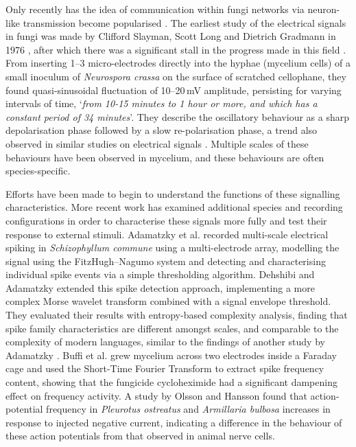 Only recently has the idea of communication within fungi networks via neuron-like transmission become popularised \cite{hunter} \cite{buffi2025review}. The earliest study of the electrical signals in fungi was made by Clifford Slayman, Scott Long and Dietrich Gradmann in 1976 \cite{slayman}, after which there was a significant stall in the progress made in this field \cite{buffi2025review}. From inserting 1--3 micro-electrodes directly into the hyphae (mycelium cells) of a small inoculum of \emph{Neurospora crassa} on the surface of scratched cellophane, they found quasi-sinusoidal fluctuation of 10--20\,mV amplitude, persisting for varying intervals of time, `\emph{from 10-15 minutes to 1 hour or more, and which has a constant period of 34 minutes}'. They describe the oscillatory behaviour as a sharp depolarisation phase followed by a slow re-polarisation phase, a trend also observed in similar studies on electrical signals \cite{adamatzky2023} \cite{springer}. Multiple scales of these behaviours have been observed in mycelium, and these behaviours are often species-specific.

Efforts have been made to begin to understand the functions of these signalling characteristics. More recent work has examined additional species and recording configurations in order to characterise these signals more fully and test their response to external stimuli. Adamatzky et al. \cite{adamatzky2023} recorded multi-scale electrical spiking in \emph{Schizophyllum commune} using a multi-electrode array, modelling the signal using the FitzHugh--Nagumo system and detecting and characterising individual spike events via a simple thresholding algorithm. Dehshibi and Adamatzky \cite{dehshibi} extended this spike detection approach, implementing a more complex Morse wavelet transform combined with a signal envelope threshold. They evaluated their results with entropy-based complexity analysis, finding that spike family characteristics are different amongst scales, and comparable to the complexity of modern languages, similar to the findings of another study by Adamatzky \cite{adamatzky2022}. Buffi et al. \cite{buffi} grew mycelium across two electrodes inside a Faraday cage and used the Short-Time Fourier Transform to extract spike frequency content, showing that the fungicide cycloheximide had a significant dampening effect on frequency activity. A study by Olsson and Hansson \cite{olsson} found that action-potential frequency in \emph{Pleurotus ostreatus} and \emph{Armillaria bulbosa} increases in response to injected negative current, indicating a difference in the behaviour of these action potentials from that observed in animal nerve cells.

